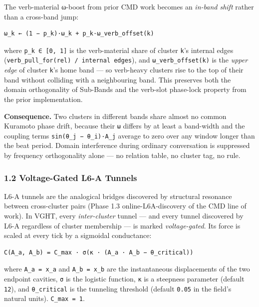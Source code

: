 \documentclass[
  11pt,
  a4paper,
]{article}
\begin{document}
The verb-material ω-boost from prior CMD work becomes an \emph{in-band
shift} rather than a cross-band jump:

\begin{verbatim}
ω_k ← (1 − p_k)·ω_k + p_k·ω_verb_offset(k)
\end{verbatim}

where \texttt{p\_k\ ∈\ {[}0,\ 1{]}} is the verb-material share of
cluster \texttt{k}'s internal edges
(\texttt{verb\_pull\_for(rel)\ /\ \textbar{}internal\ edges\textbar{}}),
and \texttt{ω\_verb\_offset(k)} is the \emph{upper edge} of cluster
\texttt{k}'s home band --- so verb-heavy clusters rise to the top of
their band without colliding with a neighbouring band. This preserves
both the domain orthogonality of Sub-Bands and the verb-slot phase-lock
property from the prior implementation.

\textbf{Consequence.} Two clusters in different bands share almost no
common Kuramoto phase drift, because their \texttt{ω} differs by at
least a band-width and the coupling terms
\texttt{sin(θ\_j\ −\ θ\_i)·A\_j} average to zero over any window longer
than the beat period. Domain interference during ordinary conversation
is suppressed by frequency orthogonality alone --- no relation table, no
cluster tag, no rule.

\subsubsection{1.2 Voltage-Gated L6-A
Tunnels}\label{voltage-gated-l6-a-tunnels}

L6-A tunnels are the analogical bridges discovered by structural
resonance between cross-cluster pairs (Phase 1.3 online-L6A-discovery of
the CMD line of work). In VGHT, every \emph{inter-cluster} tunnel ---
and every tunnel discovered by L6-A regardless of cluster membership ---
is marked \emph{voltage-gated}. Its force is scaled at every tick by a
sigmoidal conductance:

\begin{verbatim}
C(A_a, A_b) = C_max · σ(κ · (A_a · A_b − θ_critical))
\end{verbatim}

where \texttt{A\_a\ =\ \textbar{}x\_a\textbar{}} and
\texttt{A\_b\ =\ \textbar{}x\_b\textbar{}} are the instantaneous
displacements of the two endpoint cavities, \texttt{σ} is the logistic
function, \texttt{κ} is a steepness parameter (default \texttt{12}), and
\texttt{θ\_critical} is the tunneling threshold (default \texttt{0.05}
in the field's natural units). \texttt{C\_max\ =\ 1}.
\end{document}
